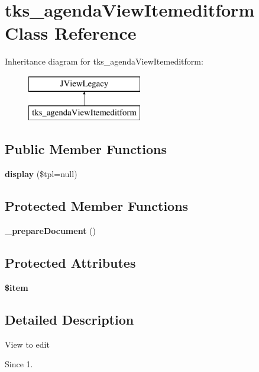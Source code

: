 \section{tks\+\_\+agenda\+View\+Itemeditform Class Reference}
\label{classtks__agenda_view_itemeditform}
Inheritance diagram for tks\+\_\+agenda\+View\+Itemeditform\+:\begin{figure}[H]
\begin{center}
\leavevmode
\includegraphics[height=2.000000cm]{classtks__agenda_view_itemeditform}
\end{center}
\end{figure}
\subsection*{Public Member Functions}
\begin{DoxyCompactItemize}
\item 
\textbf{ display} (\$tpl=null)
\end{DoxyCompactItemize}
\subsection*{Protected Member Functions}
\begin{DoxyCompactItemize}
\item 
\textbf{ \+\_\+prepare\+Document} ()
\end{DoxyCompactItemize}
\subsection*{Protected Attributes}
\begin{DoxyCompactItemize}
\item 
\textbf{ \$item}
\end{DoxyCompactItemize}


\subsection{Detailed Description}
View to edit

\begin{DoxySince}{Since}
1. 
\end{DoxySince}


